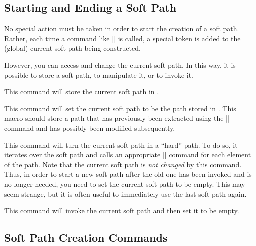\subsection{Starting and Ending a Soft Path}

No special action must be taken in order to start the creation of a
soft path. Rather, each time a command like |\pgfsyssoftpath@lineto|
is called, a special token is added to the (global) current soft path
being constructed.

However, you can access and change the current soft path. In this way,
it is possible to store a soft path, to manipulate it, or to invoke
it.

\begin{command}{\pgfsyssoftpath@getcurrentpath{}}
  This command will store the current soft path in .
\end{command}

\begin{command}{\pgfsyssoftpath@setcurrentpath{}}
  This command will set the current soft path to be the path stored in
  . This macro should store a path that has
  previously been extracted using the |\pgfsyssoftpath@getcurrentpath|
  command and has possibly been modified subsequently.
\end{command}

\begin{command}{\pgfsyssoftpath@invokecurrentpath}
  This command will turn the current soft path in a ``hard'' path. To
  do so, it iterates over the soft path and calls an appropriate
  |\pgfsys@xxxx| command for each element of the path. Note that the
  current soft path is \emph{not changed} by this command. Thus, in
  order to start a new soft path after the old one has been invoked
  and is no longer needed, you need to set the current soft path to be
  empty. This may seem strange, but it is often useful to immediately
  use the last soft path again.
\end{command}

\begin{command}{\pgfsyssoftpath@flushcurrentpath}
  This command will invoke the current soft path and then set it to be
  empty. 
\end{command}



\subsection{Soft Path Creation Commands}

